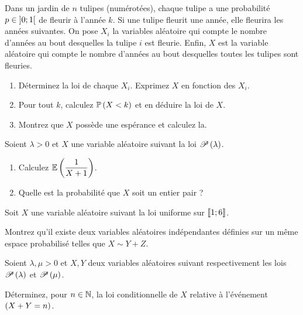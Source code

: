\begin{exo}
Dans un jardin de \(n\) tulipes (numérotées), chaque tulipe a une probabilité \(p\in\left]0;1\right[\) de fleurir à l'année \(k\). Si une tulipe fleurit une année, elle fleurira les années suivantes. On pose \(X_i\) la variables aléatoire qui compte le nombre d'années au bout desquelles la tulipe \(i\) est fleurie. Enfin, \(X\) est la variable aléatoire qui compte le nombre d'années au bout desquelles toutes les tulipes sont fleuries.

\begin{enumerate}
    \item Déterminez la loi de chaque \(X_i\). Exprimez \(X\) en fonction des \(X_i\). \\
    \item Pour tout \(k\), calculez \(\mathbb{P}\left(X<k\right)\) et en déduire la loi de \(X\). \\
    \item Montrez que \(X\) possède une espérance et calculez la.
\end{enumerate}
\end{exo}

\begin{exo}
Soient \(\lambda>0\) et \(X\) une variable aléatoire suivant la loi \(\mathscr{P}\left(\lambda\right)\).

\begin{enumerate}
    \item Calculez \(\operatorname{\mathbb{E}}\left(\dfrac{1}{X+1}\right)\). \\
    \item Quelle est la probabilité que \(X\) soit un entier pair ?
\end{enumerate}
\end{exo}

\begin{exo}
Soit \(X\) une variable aléatoire suivant la loi uniforme sur \(\left\llbracket1;6\right\rrbracket\).

Montrez qu'il existe deux variables aléatoires indépendantes définies sur un même espace probabilisé telles que \(X\sim Y+Z\).
\end{exo}

\begin{exo}
Soient \(\lambda,\mu>0\) et \(X,Y\) deux variables aléatoires suivant respectivement les lois \(\mathscr{P}\left(\lambda\right)\) et \(\mathscr{P}\left(\mu\right)\).

Déterminez, pour \(n\in\mathbb{N}\), la loi conditionnelle de \(X\) relative à l'événement \(\left(X+Y=n\right)\).
\end{exo}

